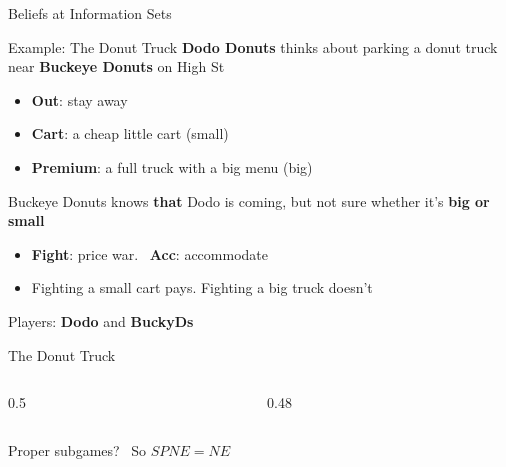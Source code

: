 
\begin{frame}[standout]
Beliefs at Information Sets
\end{frame}

\begin{frame}{Example: The Donut Truck}
\textbf{Dodo Donuts} thinks about parking a donut truck near \textbf{Buckeye Donuts} on High St
\begin{itemize}
    \item \textbf{Out}: stay away
    \item \textbf{Cart}: a cheap little cart (small)
    \item \textbf{Premium}: a full truck with a big menu (big)
\end{itemize}
\bsk
Buckeye Donuts knows \textbf{that} Dodo is coming, but not sure whether it's \textbf{big or small}
\begin{itemize}
    \item \textbf{Fight}: price war. \ \textbf{Acc}: accommodate
    \item Fighting a small cart pays. Fighting a big truck doesn't
\end{itemize}
\bsk
Players: \textbf{Dodo} and \textbf{BuckyDs}
\vspace{-0.3in}
\end{frame}

\begin{frame}{The Donut Truck}
\begin{columns}[c]
\begin{column}{0.5\textwidth}
\centering
\donuttree{}
\end{column}
\begin{column}{0.48\textwidth}
\centering
\begin{matrixgame}[top={Fight, Acc}, left={Out, Cart, Premium}, player names={Dodo, BuckyDs}, br=<2->]
\end{matrixgame}
\end{column}
\end{columns}
\bsk
Proper subgames?  \ So $SPNE=NE$
\bsk
{}
\bsk
{}
\vspace{-0.3in}
\end{frame}

